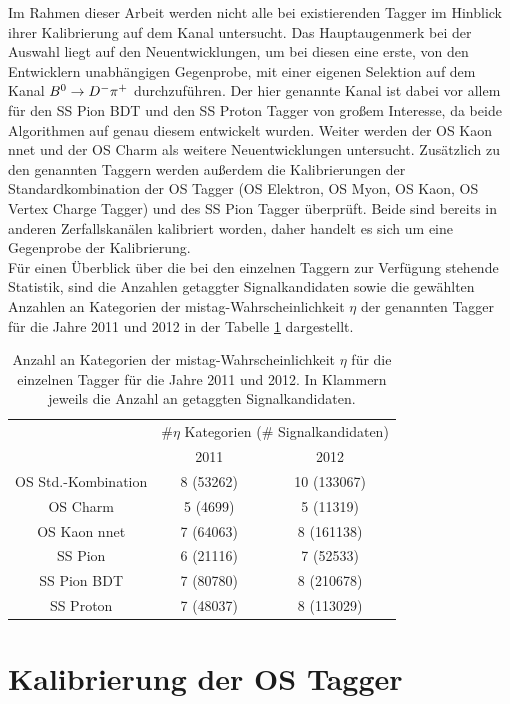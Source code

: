 Im Rahmen dieser Arbeit werden nicht alle bei \lhcb existierenden Tagger im Hinblick ihrer Kalibrierung auf dem Kanal \BdToDpi untersucht. Das Hauptaugenmerk bei der Auswahl liegt auf den Neuentwicklungen, um bei diesen eine erste, von den Entwicklern unabhängigen Gegenprobe, mit einer eigenen Selektion auf dem Kanal ${{B}^0}\rightarrow D^-\pi^+$ durchzuführen. Der hier genannte Kanal ist dabei vor allem für den SS Pion BDT und den SS Proton Tagger von großem Interesse, da beide Algorithmen auf genau diesem entwickelt wurden. Weiter werden der OS Kaon nnet  und der OS Charm als weitere Neuentwicklungen untersucht. Zusätzlich zu den genannten Taggern werden außerdem die Kalibrierungen der Standardkombination der OS Tagger (OS Elektron, OS Myon, OS Kaon, OS Vertex Charge Tagger) und des SS Pion Tagger überprüft. Beide sind bereits in anderen Zerfallskanälen kalibriert worden, daher handelt es sich um eine Gegenprobe der Kalibrierung.\\
Für einen Überblick über die bei den einzelnen Taggern zur Verfügung stehende Statistik, sind die Anzahlen getaggter Signalkandidaten sowie die gewählten Anzahlen an Kategorien der mistag-Wahrscheinlichkeit $\eta$ der genannten Tagger für die Jahre \num{2011} und \num{2012} in der Tabelle \ref{tab:anzahlen} dargestellt.
\begin{table}[htbp]
	\centering
	\caption{Anzahl an Kategorien der mistag-Wahrscheinlichkeit $\eta$ für die einzelnen Tagger für die Jahre \num{2011} und \num{2012}. In Klammern jeweils die Anzahl an getaggten Signalkandidaten.}
	\label{tab:anzahlen}
	\begin{tabular}{c|cc}
	\toprule
	& \multicolumn{2}{c}{$\#\eta$ Kategorien ($\#$ Signalkandidaten)}  \\
    	& 2011  & 2012 \\ 
	\midrule
  OS Std.-Kombination & 8 (53262) & 10 (133067)  \\
  OS Charm            & 5 (4699) & 5 (11319)  \\
  OS Kaon nnet        & 7 (64063) & 8 (161138)  \\
  SS Pion             & 6 (21116) & 7 (52533)  \\
  SS Pion BDT         & 7 (80780) & 8 (210678)  \\
  SS Proton           & 7 (48037) & 8 (113029)  \\ 
  \bottomrule
	\end{tabular}
\end{table}

\section{Kalibrierung der OS Tagger}

